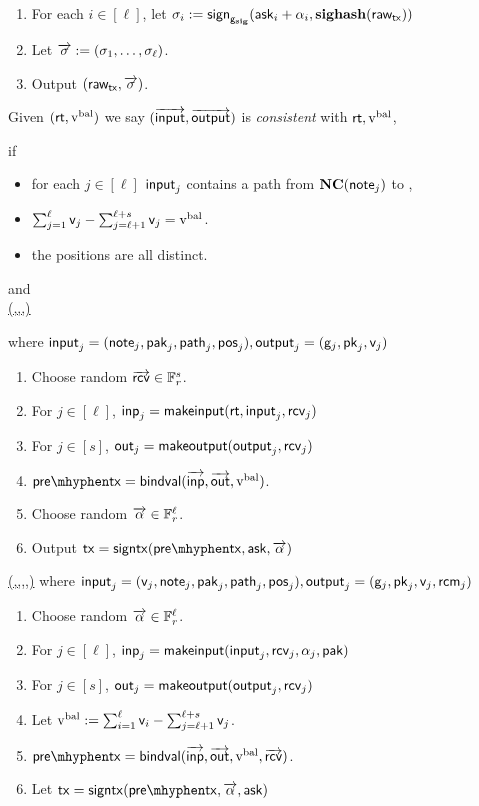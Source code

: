 \documentclass[11pt]{article}
\numberwithin{equation}{section} %
\numberwithin{figure}{section} %
\newcommand{\inp}{\ensuremath{\mathsf{inp}}\xspace}
\newcommand{\inps}{\ensuremath{\overrightarrow{\mathsf{inp}}}\xspace}
\newcommand{\outs}{\ensuremath{\overrightarrow{\mathsf{out}}}\xspace}
\newcommand{\out}{\ensuremath{\mathsf{out}}\xspace}
\begin{document}
\noindent
\underline{\signtx{\pretx=(\rawtx,\sigval),\asks,\alphas}}
\begin{enumerate}
 \item For each $i\in [\ell]$, let $\sigma_i:= \mathsf{sign}_{\mathsf{g}_{\mathbf{sig}}}(\mathsf{ask}_i+\alpha_i,\mathbf{sighash}(\mathsf{raw_{tx}}))$
 \item Let $\overrightarrow{\mathsf{\sigma}}:= (\sigma_1,\ldots,\sigma_\ell)$.
 \item Output $(\mathsf{raw_{tx}},\overrightarrow{\mathsf{\sigma}})$.
\end{enumerate}

Given $(\mathsf{rt},\mathrm{v^{bal}})$ we say $(\overrightarrow{\mathsf{input}},\overrightarrow{\mathsf{output}})$ is \emph{consistent} with $\mathsf{rt},\mathrm{v^{bal}}$,

if
\begin{itemize}
 \item for each $j\in [\ell]$ $\mathsf{input}_j$ contains a path \jof{\pak} from $\mathbf{NC}(\mathsf{note}_j)$ to \rt,
 \item $\sum_{j=1}^{\ell} \mathsf{v}_j-\sum_{j=\ell+1}^{\ell+s} \mathsf{v}_j=\mathrm{v^{bal}}$.
 \item the positions  are all distinct.
\end{itemize}


and \\
\noindent
\underline{\makerandomizedtx(\rt,\vbal,,\outputs)}

\noindent
where $\mathsf{input}_j = (\mathsf{note}_j,\mathsf{pak}_j,\mathsf{path}_j,\mathsf{pos}_j), \mathsf{output}_j =(\mathsf{g}_j,\mathsf{pk}_j,\mathsf{v}_j)$
\begin{enumerate}
 \item Choose random $\overrightarrow{\mathsf{rcv}}\in {\mathbb F}_r^s$.
 \item For $j\in [\ell]$, $\inp_j = \makeinput(\rt,\input_j,\rcv_j)$
 \item For $j\in [s]$, $\out_j=\makeoutput(\output_j,\rcv_j)$
 \item $\pretx = \bindvaltx(\inps,\outs,\vbal)$.
 \item Choose random $\overrightarrow{\mathsf{\alpha}}\in {\mathbb F}_r^{\ell}$.
 \item Output $\tx = \signtx{\pretx,\ask,\alphas}$
\end{enumerate}

\noindent
\underline{\maketx(,\outputs,\rcvs,\ask,\pak)}
where $\mathsf{input}_j = (\mathsf{v}_j,\mathsf{note}_j,\mathsf{pak}_j,\mathsf{path}_j,\mathsf{pos}_j), \mathsf{output}_j =(\mathsf{g}_j,\mathsf{pk}_j,\mathsf{v}_j,\mathsf{rcm}_j)$
\begin{enumerate}
\item Choose random $\overrightarrow{\mathsf{\alpha}}\in{\mathbb F}_r^{\ell}$.
 \item For $j\in [\ell]$, $\inp_j = \makeinput(\input_j,\rcv_j,\alpha_j,\pak)$
 \item For $j\in [s]$, $\out_j=\makeoutput(\output_j,\rcv_j)$
 \item Let $\mathrm{v^{bal}} := \sum_{i=1}^\ell\mathsf{v}_i - \sum_{j=\ell+1}^{\ell+s}\mathsf{v}_j$.
 \item $\pretx = \bindvaltx(\inps,\outs,\vbal,\rcvs)$.
 \item Let $\tx = \signtx{\pretx,\alphas,\ask}$
\end{enumerate}
\end{document}
